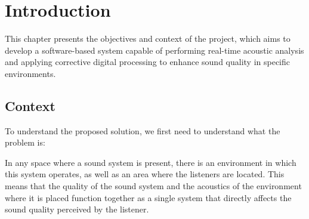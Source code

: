 \chapter{Introduction}

This chapter presents the objectives and context of the project, which aims to develop a software-based system capable of performing real-time acoustic analysis and applying corrective digital processing to enhance sound quality in specific environments.

\section{Context}

To understand the proposed solution, we first need to understand what the problem is:

In any space where a sound system is present, there is an environment in which this system operates, as well as an area where the listeners are located. This means that the quality of the sound system and the acoustics of the environment where it is placed function together as a single system that directly affects the sound quality perceived by the listener.

